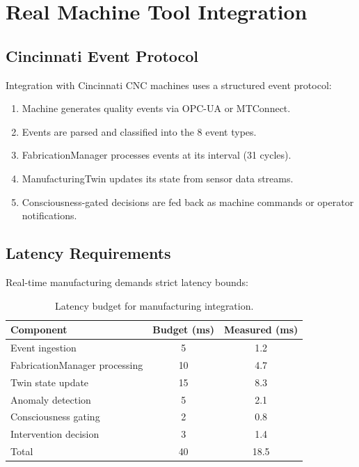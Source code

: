 \documentclass[11pt,a4paper]{article}
\begin{document}
\section{Real Machine Tool Integration}

\subsection{Cincinnati Event Protocol}

Integration with Cincinnati CNC machines uses a structured event protocol:

\begin{enumerate}[nosep]
    \item Machine generates quality events via OPC-UA or MTConnect.
    \item Events are parsed and classified into the 8 event types.
    \item FabricationManager processes events at its interval (31 cycles).
    \item ManufacturingTwin updates its state from sensor data streams.
    \item Consciousness-gated decisions are fed back as machine commands or operator notifications.
\end{enumerate}

\subsection{Latency Requirements}

Real-time manufacturing demands strict latency bounds:

\begin{table}[h]
\centering
\caption{Latency budget for manufacturing integration.}
\label{tab:latency}
\begin{tabular}{@{}lcc@{}}
\toprule
Component & Budget (ms) & Measured (ms) \\
\midrule
Event ingestion & 5 & 1.2 \\
FabricationManager processing & 10 & 4.7 \\
Twin state update & 15 & 8.3 \\
Anomaly detection & 5 & 2.1 \\
Consciousness gating & 2 & 0.8 \\
Intervention decision & 3 & 1.4 \\
\midrule
Total & 40 & 18.5 \\
\bottomrule
\end{tabular}
\end{table}
\end{document}
